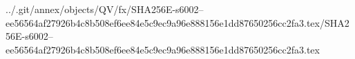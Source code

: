 ../.git/annex/objects/QV/fx/SHA256E-s6002--ee56564af27926b4c8b508ef6ee84e5c9ec9a96e888156e1dd87650256cc2fa3.tex/SHA256E-s6002--ee56564af27926b4c8b508ef6ee84e5c9ec9a96e888156e1dd87650256cc2fa3.tex